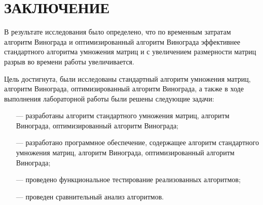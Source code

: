 \chapter*{\hfill{\centering \MakeUppercase{Заключение}}\hfill}

В результате исследования было определено, что по временным затратам алгоритм Винограда и оптимизированный алгоритм Винограда эффективнее стандартного алгоритма умножения матриц и с увеличением размерности матриц разрыв во времени работы увеличивается.

Цель достигнута, были исследованы стандартный алгоритм умножения матриц, алгоритм Винограда, оптимизированный алгоритм Винограда, а также в ходе выполнения лабораторной работы были решены следующие задачи:

\begin{itemize}
    \item[---] разработаны алгоритм стандартного умножения матриц, алгоритм Винограда, оптимизированный алгоритм Винограда;
    \item[---] разработано программное обеспечение, содержащее алгоритм стандартного умножения матриц, алгоритм Винограда, оптимизированный алгоритм Винограда;
    \item[---] проведено функциональное тестирование реализованных алгоритмов;
    \item[---] проведен сравнительный анализ алгоритмов.
\end{itemize}
